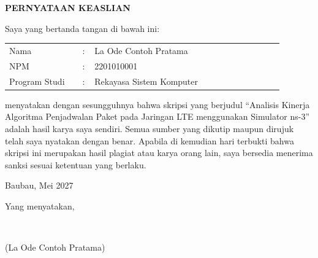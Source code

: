 \begin{halamanbaru}\end{halamanbaru}
\thispagestyle{empty}
\begin{tengah}
\textbf{PERNYATAAN KEASLIAN}
\end{tengah}
Saya yang bertanda tangan di bawah ini:

\begin{tanpagaris}
\begin{longtable}{@{}p{0.24\linewidth}p{0.04\linewidth}p{0.62\linewidth}@{}}
Nama & : & La Ode Contoh Pratama \\
NPM & : & 2201010001 \\
Program Studi & : & Rekayasa Sistem Komputer \\
\end{longtable}
\end{tanpagaris}

menyatakan dengan sesungguhnya bahwa skripsi yang berjudul “Analisis Kinerja Algoritma Penjadwalan Paket pada Jaringan LTE menggunakan Simulator ns-3” adalah hasil karya saya sendiri. Semua sumber yang dikutip maupun dirujuk telah saya nyatakan dengan benar. Apabila di kemudian hari terbukti bahwa skripsi ini merupakan hasil plagiat atau karya orang lain, saya bersedia menerima sanksi sesuai ketentuan yang berlaku.

\begin{kanan}
Baubau, Mei 2027

Yang menyatakan,

~

(La Ode Contoh Pratama)
\end{kanan}
\begin{akhirsampul}\end{akhirsampul}   %
